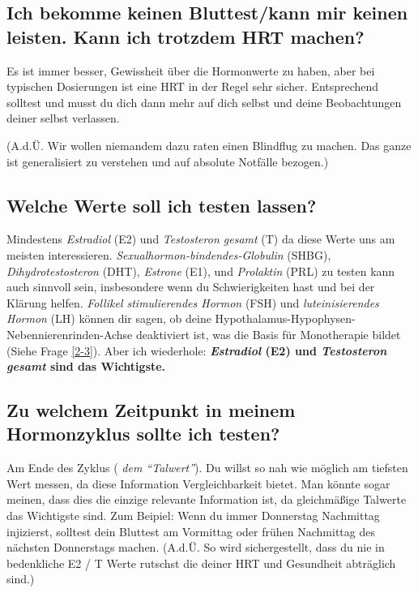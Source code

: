 \documentclass{article}
\begin{document}
\subsection{Ich bekomme keinen Bluttest/kann mir keinen leisten. Kann ich trotzdem HRT machen?}

Es ist immer besser, Gewissheit über die Hormonwerte zu haben, aber bei typischen Dosierungen ist eine HRT in der Regel sehr sicher. Entsprechend solltest und musst du dich dann mehr auf dich selbst und deine Beobachtungen  deiner selbst verlassen.

(A.d.Ü. Wir wollen niemandem dazu raten einen Blindflug zu machen. Das ganze ist generalisiert zu verstehen und auf absolute Notfälle bezogen.)

\subsection{Welche Werte soll ich testen lassen?}

Mindestens \textit{Estradiol} (E2) und \textit{Testosteron gesamt} (T) da diese Werte uns am meisten interessieren. \textit{Sexualhormon-bindendes-Globulin} (SHBG), \textit{Dihydrotestosteron} (DHT), \textit{Estrone} (E1), und \textit{Prolaktin }(PRL) zu testen kann auch sinnvoll sein, insbesondere wenn du Schwierigkeiten hast und bei der Klärung helfen. \textit{Follikel stimulierendes Hormon} (FSH) und \textit{luteinisierendes Hormon} (LH) können dir sagen, ob deine Hypothalamus-Hypophysen-Nebennierenrinden-Achse deaktiviert ist, was die Basis für Monotherapie bildet (Siehe Frage \ref{2-3}). Aber ich wiederhole: \textbf{\textit{Estradiol} (E2) und \textit{Testosteron gesamt} sind das Wichtigste. }

\subsection{Zu welchem Zeitpunkt in meinem Hormonzyklus sollte ich testen?}

Am Ende des Zyklus (\textit{ dem “Talwert”}). Du willst so nah wie möglich am tiefsten Wert messen, da diese Information Vergleichbarkeit bietet. Man könnte sogar meinen, dass dies die einzige relevante Information ist, da gleichmäßige Talwerte das Wichtigste sind. Zum Beipiel: Wenn du immer Donnerstag Nachmittag injizierst, solltest dein Bluttest am Vormittag oder frühen Nachmittag des nächsten Donnerstags machen. (A.d.Ü. So wird sichergestellt, dass du nie in bedenkliche E2 / T Werte rutschst die deiner HRT und Gesundheit abträglich sind.)
\end{document}
